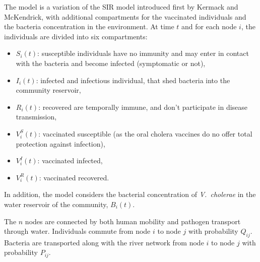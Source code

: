 The model is a variation of the SIR model introduced first by Kermack and McKendrick\cite{Kermack:ContributionMathematicalTheory:1927}, with additional compartments for the vaccinated individuals and the bacteria concentration in the environment. At time $t$ and for each node $i$, the individuals are divided into six compartments:
\begin{itemize}
\item $S_i(t)$: susceptible individuals  have no immunity and may enter in contact with the bacteria and become infected (symptomatic or not),
\item $I_i(t)$: infected and infectious individual, that shed bacteria into the community reservoir,
\item $R_i(t)$: recovered are temporally immune, and don't participate in disease transmission,
\item $V^S_i(t)$: vaccinated susceptible (as the oral cholera vaccines do no offer total protection against infection),
\item $V^I_i(t)$: vaccinated infected,
\item $V^R_i(t)$: vaccinated recovered.
\end{itemize}

In addition, the model considers the bacterial concentration of \textit{V.~cholerae} in the water reservoir of the community, $B_i(t)$. 

The $n$ nodes are connected by both human mobility and pathogen transport through water. Individuals commute from node $i$ to node $j$ with probability $Q_{ij}$. Bacteria are transported along with the river network from node $i$ to node $j$ with probability $P_{ij}$.

